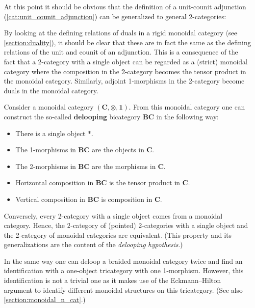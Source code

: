     At this point it should be obvious that the definition of a unit-counit adjunction (\cref{cat:unit_counit_adjunction}) can be generalized to general 2-categories:
    \begin{remark}
        By looking at the defining relations of duals in a rigid monoidal category (see \cref{section:duality}), it should be clear that these are in fact the same as the defining relations of the unit and counit of an adjunction. This is a consequence of the fact that a 2-category with a single object can be regarded as a (strict) monoidal category where the composition in the 2-category becomes the tensor product in the monoidal category. Similarly, adjoint 1-morphisms in the 2-category become duals in the monoidal category.
    \end{remark}

    \begin{property}\label{cat:monoidal_or_2}
        Consider a monoidal category $(\mathbf{C},\otimes,\mathbf{1})$. From this monoidal category one can construct the so-called \textbf{delooping} bicategory $\mathbf{BC}$ in the following way:
        \begin{itemize}
            \item There is a single object $\ast$.
            \item The 1-morphisms in $\mathbf{BC}$ are the objects in $\mathbf{C}$.
            \item The 2-morphisms in $\mathbf{BC}$ are the morphisms in $\mathbf{C}$.
            \item Horizontal composition in $\mathbf{BC}$ is the tensor product in $\mathbf{C}$.
            \item Vertical composition in $\mathbf{BC}$ is composition in $\mathbf{C}$.
        \end{itemize}
        Conversely, every 2-category with a single object comes from a monoidal category. Hence, the 2-category of (pointed) 2-categories with a single object and the 2-category of monoidal categories are equivalent. (This property and its generalizations are the content of the \textit{delooping hypothesis}.)

        In the same way one can deloop a braided monoidal category twice and find an identification with a one-object tricategory with one 1-morphism. However, this identification is not a trivial one as it makes use of the Eckmann--Hilton argument to identify different monoidal structures on this tricategory. (See also \cref{section:monoidal_n_cat}.)
    \end{property}

